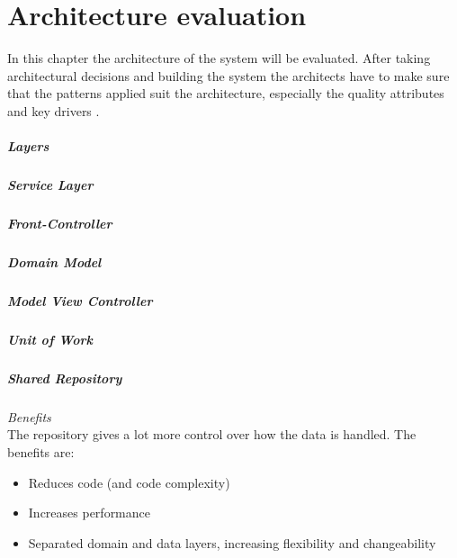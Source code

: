 
\newcommand{\bo}[1]{\textbf{#1}}

\chapter{Architecture evaluation}
\label{ch:evaluation}

In this chapter the architecture of the system will be evaluated. After taking architectural decisions and building the system the architects have to make sure that the patterns applied suit the architecture, especially the quality attributes and key drivers .%


\paragraph{Layers}
\paragraph{Service Layer}
\paragraph{Front-Controller}
\paragraph{Domain Model}
\paragraph{Model View Controller}
\paragraph{Unit of Work}
\paragraph{Shared Repository} 

\textit{Benefits} \\

The repository gives a lot more control over how the data is handled. The benefits are:
\begin{itemize}
\item Reduces code (and code complexity)
\item Increases performance
\item Separated domain and data layers, increasing flexibility and changeability
\end{itemize}

